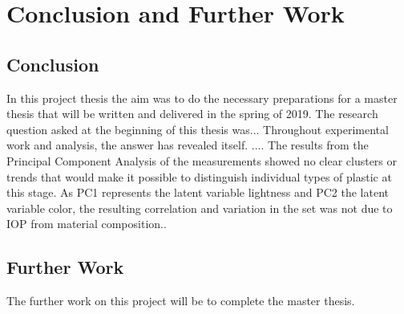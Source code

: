 \chapter{Conclusion and Further Work}
\label{chap:conclusion}
\section{Conclusion}
In this project thesis the aim was to do the necessary preparations for a master thesis that will be written and delivered in the spring of 2019. The research question asked at the beginning of this thesis was... Throughout experimental work and analysis, the answer has revealed itself. 
....
The results from the Principal Component Analysis of the measurements showed no clear clusters or trends that would make it possible to distinguish individual types of plastic at this stage. As PC1 represents the latent variable lightness and PC2 the latent variable color, the resulting correlation and variation in the set was not due to IOP from material composition..


\section{Further Work}
The further work on this project will be to complete the master thesis. 